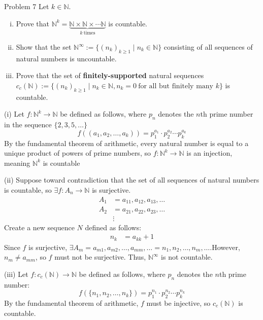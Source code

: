 \documentclass[10pt]{extarticle}
\begin{document}
  \begin{problem}{Problem 7}
    Let $k\in\mathbb{N}$.
    \begin{enumerate}[(i)]
      \item Prove that $\mathbb{N}^k = \underbrace{\mathbb{N}\times\mathbb{N}\times\cdots\mathbb{N}}_{k~\textrm{times}}$ is countable.
      \item Show that the set $\mathbb{N}^{\infty} := \{(n_k)_{k\geq 1}\mid n_k\in \mathbb{N}\}$ consisting of all sequences of natural numbers is uncountable.
      \item Prove that the set of \textbf{finitely-supported} natural sequences $c_c(\mathbb{N}) := \{(n_k)_{k\geq 1} \mid n_k\in\mathbb{N}, n_k=0~\text{for all but finitely many }k\}$ is countable.
    \end{enumerate}
    \tcblower
    \begin{problem}{(i)}
      Let $f: \mathbb{N}^k \rightarrow \mathbb{N}$ be defined as follows, where $p_n$ denotes the $n$th prime number in the sequence $\{2,3,5,\dots\}$
      \[
        f((a_1,a_2,\dots,a_k)) = p_1^{a_1}\cdot p_2^{a_2}\cdots p_k^{a_k}
      \] 
      By the fundamental theorem of arithmetic, every natural number is equal to a unique product of powers of prime numbers, so $f: \mathbb{N}^k \rightarrow \mathbb{N}$ is an injection, meaning $\mathbb{N}^k$ is countable
    \end{problem}
    \begin{problem}{(ii)}
      Suppose toward contradiction that the set of all sequences of natural numbers is countable, so $\exists f:A_n \rightarrow \mathbb{N}$ is surjective.
      \begin{align*}
        A_1 &= a_{11},a_{12},a_{13},\dots\\
        A_2 &= a_{21},a_{22},a_{23},\dots\\
            &\vdots
      \end{align*}
      Create a new sequence $N$ defined as follows:
      \begin{align*}
        n_{k} &= a_{kk} + 1
      \end{align*}
      Since $f$ is surjective, $\exists A_m = a_{m1},a_{m2},\dots,a_{mm},\dots = n_{1},n_{2},\dots,n_{m},\dots$.However, $n_m \neq a_{mm}$, so $f$ must not be surjective. Thus, $\mathbb{N}^{\infty}$ is not countable.
    \end{problem}
    \begin{problem}{(iii)}
      Let $f: c_c(\mathbb{N}) \rightarrow \mathbb{N}$ be defined as follows, where $p_n$ denotes the $n$th prime number:
      \[
        f(\{n_1,n_2,\dots,n_k\}) = p_1^{n_1}\cdot p_2^{n_2}\cdots p_{k}^{n_k}
      \] 
      By the fundamental theorem of arithmetic, $f$ must be injective, so $c_c(\mathbb{N})$ is countable.
    \end{problem}
  \end{problem}
\end{document}
